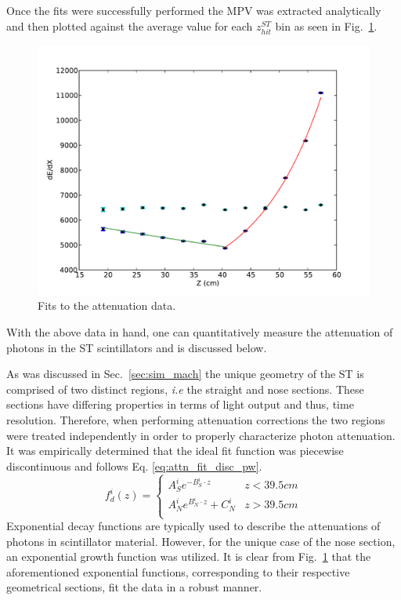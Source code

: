 Once the fits were successfully performed the MPV was extracted analytically and then plotted against the average value for each $z^{ST}_{hit}$ bin as seen in Fig.~\ref{fig:attfits}.
\begin{figure}[!htb]
	\centering
	\includegraphics[width=1.0\columnwidth]{calibration/figs/Att_Fit15}
	\caption{Fits to the attenuation data.}
	\label{fig:attfits}
\end{figure}
With the above data in hand, one can quantitatively measure the attenuation of photons in the ST scintillators and is discussed below.

As was discussed in Sec.~\ref{sec:sim_mach} the unique geometry of the ST is comprised of two distinct regions, \textit{i.e} the straight and nose sections.  These sections have differing properties in terms of light output and thus, time resolution.  Therefore, when performing attenuation corrections the two regions were treated independently in order to properly characterize photon attenuation.  It was empirically determined that the ideal fit function was piecewise discontinuous and follows Eq. \ref{eq:attn_fit_disc_pw}.
	\begin{equation} \label{eq:attn_fit_disc_pw}
	f_{d}^{i}(z) = 
	\begin{cases} 
		A^{i}_{S}e^{-B^{i}_{S} \cdot z} & z < 39.5 cm \\
		A^{i}_{N}e^{B^{i}_{N} \cdot z} + C^{i}_{N} & z > 39.5 cm \\
	\end{cases}
	\end{equation}
Exponential decay functions are typically used to describe the attenuations of photons in scintillator material.  However, for the unique case of the nose section, an exponential growth function was utilized.  It is clear from Fig.~\ref{fig:attfits} that the aforementioned exponential functions, corresponding to their respective geometrical sections, fit the data in a robust manner.

